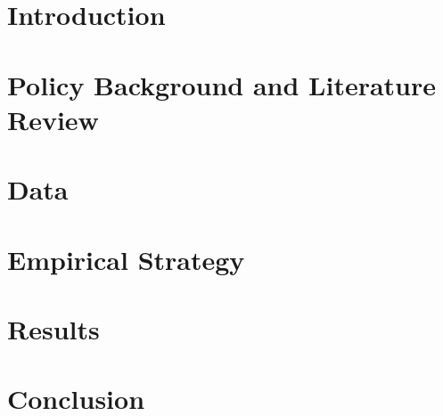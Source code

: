 \documentclass[12pt]{article}
\begin{document}
\section{Introduction} \label{introduction}


\section{Policy Background and Literature Review} \label{policy_background}


\section{Data} \label{data}


\section{Empirical Strategy} \label{empirical_strategy}


\section{Results} \label{results}


\section{Conclusion} \label{conclusion}



\clearpage

\singlespacing





\newpage 

\end{document}
